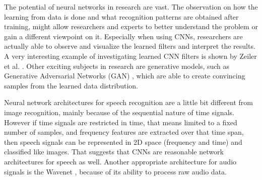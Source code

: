 The potential of neural networks in research are vast.
The observation on how the learning from data is done and what recognition patterns are obtained after training, might allow researchers and experts to better understand the problem or gain a different viewpoint on it.
Especially when using CNNs, researchers are actually able to observe and visualize the learned filters and interpret the results.
A very interesting example of investigating learned CNN filters is shown by Zeiler et al. \cite{Zeiler2013}.
Other exciting subjects in research are generative models, such as Generative Adversarial Networks (GAN) \cite{Goodfellow2014}, which are able to create convincing samples from the learned data distribution.

Neural network architectures for speech recognition are a little bit different from image recognition, mainly because of the sequential nature of time signals.
However if time signals are restricted in time, that means limited to a fixed number of samples, and frequency features are extracted over that time span, then speech signals can be represented in 2D space (frequency and time) and classified like images.
That suggests that CNNs are reasonable network architectures for speech as well.
Another appropriate architecture for audio signals is the Wavenet \cite{Oord2016}, because of its ability to process raw audio data.


